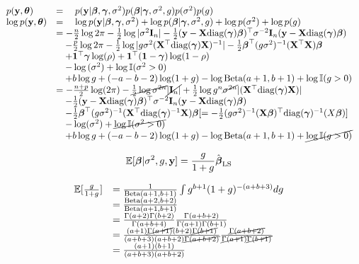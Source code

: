 \documentclass{amsart}[12pt]
\begin{document}
\begin{equation*}
\begin{array}{ll}
p({\bf y}, {\boldsymbol \theta}) &= \quad p({\bf y} | {\boldsymbol \beta}, {\boldsymbol \gamma}, \sigma^2) p({\boldsymbol \beta} | {\boldsymbol \gamma}, \sigma^2, g) p(\sigma^2) p(g) \\
\log{p({\bf y}, {\boldsymbol\theta})} &= \quad \log{p({\bf y}| {\boldsymbol\beta}, {\boldsymbol\gamma}, \sigma^2)} + \log{p({\boldsymbol\beta}| {\boldsymbol\gamma}, \sigma^2, g)} + \log{p(\sigma^2)} + \log{p(g)} \\
&= -\frac{n}{2} \log{2 \pi} -\tfrac{1}{2} \log |\sigma^2 {\bf I}_n| - \tfrac{1}{2} ({\bf y} - {\bf X} \text{diag}({\boldsymbol \gamma}) {\boldsymbol \beta})^\top \sigma^{-2} {\bf I}_n ({\bf y} - {\bf X} \text{diag}({\boldsymbol \gamma}) {\boldsymbol \beta}) \\
& \quad -\frac{p}{2} \log{2 \pi} - \tfrac{1}{2} \log |g \sigma^2 ({\bf X}^\top \text{diag}({\boldsymbol \gamma}) {\bf X})^{-1}| -
	\tfrac{1}{2} {\boldsymbol \beta}^\top (g \sigma^2)^{-1} ({\bf X}^\top {\bf X}) {\boldsymbol \beta} \\
& \quad + {\bf 1}^\top {\boldsymbol\gamma} \log(\rho) + {\bf 1}^\top ({\bf 1} - {\boldsymbol \gamma}) \log(1 - \rho)\\
& \quad - \log{(\sigma^2)} + \log {\mathbb I} (\sigma^2 > 0) \\
& \quad + b \log g + (-a - b - 2) \log(1 + g) - \log \text{Beta}(a + 1,  b + 1) + \log {\mathbb I}(g > 0)\\
& = -\frac{n + p}{2} \log(2 \pi) - \cancel{\tfrac{1}{2} \log{\sigma^{2n}}} \cancel{|{\bf I}_n|} 
		+\tfrac{1}{2} \log{g^n \cancel{\sigma^{2n}}} |({\bf X}^\top \text{diag}({\boldsymbol \gamma}) {\bf X})| \\
&\quad		-\tfrac{1}{2} ({\bf y} - {\bf X} \text{diag}({\boldsymbol \gamma}) {\boldsymbol \beta})^\top \sigma^{-2} {\bf I}_n ({\bf y} - {\bf X} \text{diag}({\boldsymbol \gamma}) {\boldsymbol \beta})\\
&\quad		-\tfrac{1}{2} {\boldsymbol \beta}^\top (g \sigma^2)^{-1} ({\bf X}^\top \text{diag}({\boldsymbol \gamma})^{-1} {\bf X}) {\boldsymbol \beta} [= -\tfrac{1}{2} (g \sigma^2)^{-1} ({\bf X} {\boldsymbol \beta})^\top \text{diag}({\boldsymbol \gamma})^{-1} (X {\boldsymbol \beta})]\\
&\quad - \log(\sigma^2) + \cancel{\log {\mathbb I}(\sigma^2 > 0)} \\
&\quad + b \log g + (-a - b - 2) \log(1 + g) - \log \text{Beta}(a + 1,  b + 1) + \cancel{\log {\mathbb I}(g > 0)}
\end{array}
\end{equation*}

\[
	\mathbb{E}[{\boldsymbol \beta} | \sigma^2, g, {\bf y}] = \frac{g}{1 + g} \hat{{\boldsymbol \beta}}_{\text{LS}}
\]

\begin{equation*}
\begin{array}{rl}
\mathbb{E}[\frac{g}{1 + g}] &= \frac{1}{\text{Beta} (a +1, b + 1)} \int g^{b+1} (1 + g)^{-(a + b + 3)} dg \\
&= \frac{\text{Beta} (a + 2, b + 2)}{\text{Beta} (a + 1, b + 1)} \\
&= \frac{\Gamma(a + 2) \Gamma(b + 2)}{\Gamma(a + b + 4)} \frac{\Gamma(a + b + 2)}{\Gamma(a + 1) \Gamma(b + 1)} \\
&=  \frac{(a + 1) \cancel{\Gamma(a + 1)} (b + 2) \cancel{\Gamma(b + 1)}}{(a + b + 3) (a + b + 2) \cancel{\Gamma(a + b + 2)}} \frac{\cancel{\Gamma(a + b + 2)}}{\cancel{\Gamma(a + 1)} \cancel{\Gamma(b + 1)}} \\
&= \frac{(a + 1) (b + 1)}{(a + b + 3) (a + b + 2)}
\end{array}
\end{equation*}
\end{document}
